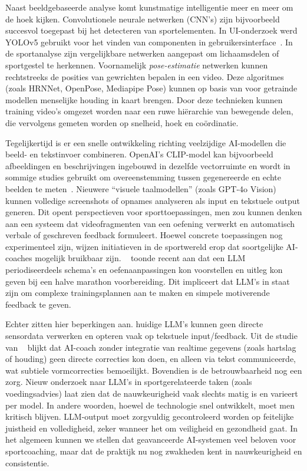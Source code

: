 Naast beeldgebaseerde analyse komt kunstmatige intelligentie meer en meer om de hoek kijken. Convolutionele neurale netwerken (CNN’s) zijn bijvoorbeeld succesvol toegepast bij het detecteren van sportelementen. In UI-onderzoek werd YOLOv5 gebruikt voor het vinden van componenten in gebruikersinterface~\autocite{Altinbas2022}. In de sportanalyse zijn vergelijkbare netwerken aangepast om lichaamsdelen of sportgestel te herkennen. Voornamelijk \textit{pose-estimatie} netwerken kunnen rechtstreeks de posities van gewrichten bepalen in een video. Deze algoritmes (zoals HRNNet, OpenPose, Mediapipe Pose) kunnen op basis van voor getrainde modellen menselijke houding in kaart brengen. Door deze technieken kunnen training video's omgezet worden naar een ruwe hiërarchie van bewegende delen, die vervolgens gemeten worden op snelheid, hoek en coördinatie.

Tegelijkertijd is er een snelle ontwikkeling richting veelzijdige AI-modellen die beeld- en tekstinvoer combineren. OpenAI's CLIP-model kan bijvoorbeeld afbeeldingen en beschrijvingen ingebouwd in dezelfde vectorruimte en wordt in sommige studies gebruikt om overeenstemming tussen gegenereerde en echte beelden te meten~\autocite{Lee2025}. Nieuwere ``visuele taalmodellen'' (zoals GPT-4o Vision) kunnen volledige screenshots of opnames analyseren als input en tekstuele output generen. Dit opent perspectieven voor sporttoepassingen, men zou kunnen denken aan een systeem  dat videofragmenten van een oefening verwerkt en automatisch verbale of geschreven feedback formuleert. Hoewel concrete toepassingen nog experimenteel zijn, wijzen initiatieven in de sportwereld erop dat soortgelijke AI-coaches mogelijk bruikbaar zijn. ~\textcite{Lee2025} toonde recent aan dat een LLM periodiseerdeels schema's en oefenaanpassingen kon voorstellen en uitleg kon geven bij een halve marathon voorbereiding. Dit impliceert dat LLM's in staat zijn om complexe trainingsplannen aan te maken en simpele motiverende feedback te geven.

Echter zitten hier beperkingen aan. huidige LLM's kunnen geen directe sensordata verwerken en opteren vaak op tekstuele input/feedback. Uit de studie van ~\textcite{Lee2025} blijkt dat AI-coach zonder integratie van realtime gegevens (zoals hartslag of houding) geen directe correcties kon doen, en alleen via tekst communiceerde, wat subtiele vormcorrecties bemoeilijkt. Bovendien is de betrouwbaarheid nog een zorg. Nieuw onderzoek naar LLM's in sportgerelateerde taken (zoals voedingsadvies) laat zien dat de nauwkeurigheid vaak slechts matig is en varieert per model. In andere woorden, hoewel de technologie snel ontwikkelt, moet men kritisch blijven. LLM-output moet zorgvuldig gecontroleerd worden op feitelijke juistheid en volledigheid, zeker wanneer het om veiligheid en gezondheid gaat. In het algemeen kunnen we stellen dat geavanceerde AI-systemen veel beloven voor sportcoaching, maar dat de praktijk nu nog zwakheden kent in nauwkeurigheid en consistentie.~\autocite{Lee2025,Solomon2025}


